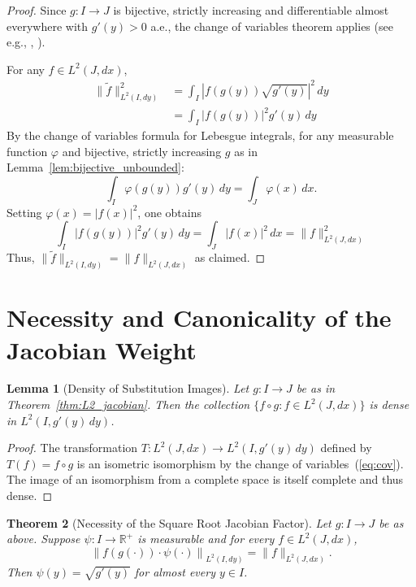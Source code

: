 \documentclass[12pt]{article}
\newtheorem{theorem}{Theorem}[section]
\newtheorem{lemma}[theorem]{Lemma}
\renewcommand{\eqref}[1]{(\ref{#1})}
\begin{document}
\begin{proof}
Since $g: I \to J$ is bijective, strictly increasing and differentiable almost everywhere with $g'(y) > 0$ a.e., the change of variables theorem applies (see e.g., \cite{RoydenFitzpatrick}, \cite{Folland}).

For any $f \in L^2(J, dx)$,
\begin{align}
    \| \widetilde{f} \|_{L^2(I, dy)}^2 
    &= \int_I | f(g(y)) \sqrt{g'(y)} |^2 \, dy \label{eq:normexpansion1}\\
    &= \int_I |f(g(y))|^2 g'(y) \, dy \label{eq:normexpansion2}
\end{align}
By the change of variables formula for Lebesgue integrals, for any measurable function $\varphi$ and bijective, strictly increasing $g$ as in Lemma~\ref{lem:bijective_unbounded}:
\begin{equation}\label{eq:cov}
    \int_I \varphi(g(y)) g'(y) \, dy = \int_{J} \varphi(x) \, dx.
\end{equation}
Setting $\varphi(x) = |f(x)|^2$, one obtains
\begin{equation}
    \int_I |f(g(y))|^2 g'(y) \, dy = \int_J |f(x)|^2 \, dx = \| f \|_{L^2(J,dx)}^2 \label{eq:aftercov}
\end{equation}
Thus, $\| \widetilde{f} \|_{L^2(I, dy)} = \| f \|_{L^2(J, dx)}$ as claimed.
\end{proof}

\section{Necessity and Canonicality of the Jacobian Weight}

\begin{lemma}[Density of Substitution Images]\label{lem:L2density}
Let $g: I \rightarrow J$ be as in Theorem~\ref{thm:L2_jacobian}. Then the collection $\{f \circ g : f \in L^2(J, dx) \}$ is dense in $L^2(I, g'(y)\,dy)$.
\end{lemma}
\begin{proof}
The transformation $T: L^2(J, dx) \to L^2(I, g'(y)\,dy)$ defined by $T(f) = f \circ g$ is an isometric isomorphism by the change of variables~\eqref{eq:cov}. The image of an isomorphism from a complete space is itself complete and thus dense.
\end{proof}

\begin{theorem}[Necessity of the Square Root Jacobian Factor]\label{thm:necessity}
Let $g: I \to J$ be as above. Suppose $\psi : I \to \mathbb{R}^+$ is measurable and for every $f \in L^2(J, dx)$,
\begin{equation}\label{eq:generalweight}
    \left\| f(g(\cdot)) \cdot \psi(\cdot) \right\|_{L^2(I, dy)} = \| f \|_{L^2(J, dx)}.
\end{equation}
Then $\psi(y) = \sqrt{g'(y)}$ for almost every $y \in I$.
\end{theorem}
\end{document}
